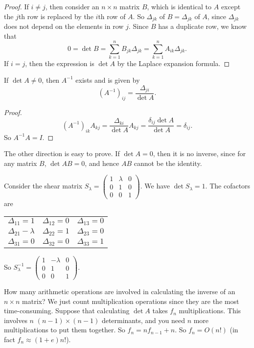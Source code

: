 \documentclass[a4paper]{article}
\begin{document}
\begin{proof}
  If $i \not= j$, then consider an $n\times n$ matrix $B$, which is identical to $A$ except the $j$th row is replaced by the $i$th row of $A$. So $\Delta_{jk}$ of $B = \Delta_{jk}$ of $A$, since $\Delta_{jk}$ does not depend on the elements in row $j$. Since $B$ has a duplicate row, we know that
  \[
    0 = \det B = \sum_{k = 1}^n B_{jk}\Delta_{jk} = \sum_{k = 1}^n A_{ik}\Delta_{jk}.
  \]
  If $i = j$, then the expression is $\det A$ by the Laplace expansion formula.
\end{proof}

\begin{thm}
  If $\det A \not =0$, then $A^{-1}$ exists and is given by
  \[
    (A^{-1})_{ij} = \frac{\Delta_{ji}}{\det A}.
  \]
\end{thm}

\begin{proof}
  \[
    (A^{-1})_{ik}A_{kj} = \frac{\Delta_{ki}}{\det A} A_{kj} = \frac{\delta_{ij}\det A}{\det A} = \delta_{ij}.
  \]
  So $A^{-1}A = I$.
\end{proof}
The other direction is easy to prove. If $\det A = 0$, then it is no inverse, since for any matrix $B$, $\det AB = 0$, and hence $AB$ cannot be the identity.

\begin{eg}
  Consider the shear matrix $S_\lambda = \begin{pmatrix} 1 & \lambda & 0 \\ 0 & 1 & 0\\ 0 & 0 & 1\end{pmatrix}$. We have $\det{S_\lambda} = 1$. The cofactors are
  \begin{center}
    \begin{tabular}{ccc}
      $\Delta_{11} = 1$       & $\Delta_{12} = 0$ & $\Delta_{13} = 0$ \\
      $\Delta_{21} - \lambda$ & $\Delta_{22} = 1$ & $\Delta_{23} = 0$ \\
      $\Delta_{31} = 0$       & $\Delta_{32} = 0$ & $\Delta_{33} = 1$
    \end{tabular}
  \end{center}
  So $S_\lambda^{-1} = \begin{pmatrix} 1 & -\lambda & 0\\ 0 & 1 & 0\\ 0 & 0 & 1\end{pmatrix}$.
\end{eg}

How many arithmetic operations are involved in calculating the inverse of an $n\times n$ matrix? We just count multiplication operations since they are the most time-consuming. Suppose that calculating $\det A$ takes $f_n$ multiplications. This involves $n$ $(n - 1)\times (n - 1)$ determinants, and you need $n$ more multiplications to put them together. So $f_n = nf_{n -1} + n$. So $f_n = O(n!)$ (in fact $f_n \approx (1 + e)n!$).
\end{document}
